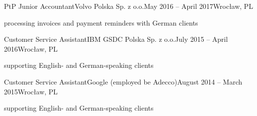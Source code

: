 \begin{cveventis}{PtP Junior Accountant}{Volvo Polska Sp. z o.o.}{May 2016 -- April 2017}{Wroc\l aw, PL}
	\item processing invoices and payment reminders with German clients
\end{cveventis}
%
\divider
\begin{cveventis}{Customer Service Assistant}{IBM GSDC Polska Sp. z o.o.}{July 2015 -- April 2016}{Wroc\l aw, PL}
	\item supporting English- and German-speaking clients
\end{cveventis}
%
\divider
\begin{cveventis}{Customer Service Assistant}{Google (employed be Adecco)}{August 2014 -- March 2015}{Wroc\l aw, PL}
	\item supporting English- and German-speaking clients
\end{cveventis}



